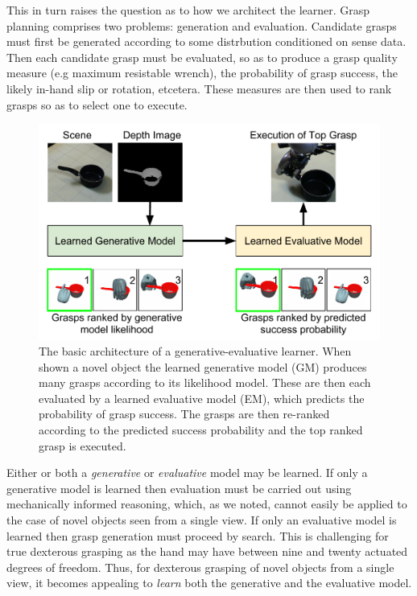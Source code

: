 This in turn raises the question as to how we architect the learner. Grasp planning comprises two problems: generation and evaluation. Candidate grasps must first be generated according to some distrbution conditioned on sense data. Then each candidate grasp must be evaluated, so as to produce a grasp quality measure (e.g maximum resistable wrench), the probability of grasp success, the likely in-hand slip or rotation, etcetera. These measures are then used to rank grasps so as to select one to execute.
\begin{figure}[t]
\begin{center}
  \includegraphics[width=\columnwidth]{images/contribution.pdf}
  \end{center}
  \caption{The basic architecture of a generative-evaluative learner. When shown a novel object the learned generative model (GM) produces many grasps according to its likelihood model. These are then each evaluated by a learned evaluative model (EM), which predicts the probability of grasp success. The grasps are then re-ranked according to the predicted success probability and the top ranked grasp is executed.}
\label{fig:systemArchitecture}
\end{figure}
Either or both a {\em generative} or {\em evaluative} model may be learned. If only a generative model is learned then evaluation must be carried out using mechanically informed reasoning, which, as we noted, cannot easily be applied to the case of novel objects seen from a single view. If only an evaluative model is learned then grasp generation must proceed by search. This is challenging for true dexterous grasping as the hand may have between nine and twenty actuated degrees of freedom. Thus, for dexterous grasping of novel objects from a single view, it becomes appealing to {\em learn} both the generative and the evaluative model. 

